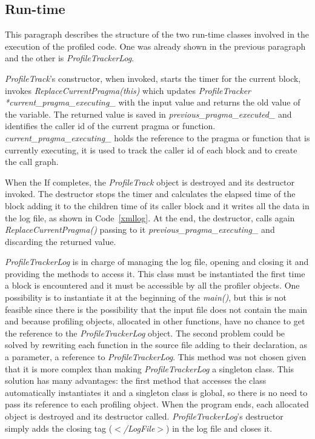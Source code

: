 \documentclass[a4paper,12pt,oneside]{book}
\begin{document}
\subsection{Run-time}
\label{profilerun}

This paragraph describes the structure of the two run-time classes involved in the execution of the profiled code. One was already shown in the previous paragraph and the other is \emph{ProfileTrackerLog}. 

\emph{ProfileTrack}’s constructor, when invoked, starts the timer for the current block, invokes \emph{ReplaceCurrentPragma(this)} which updates \emph{ProfileTracker *current\_pragma\_executing\_} with the input value and returns the old value of the variable. The returned value is saved in \emph{previous\_pragma\_executed\_} and identifies the caller id of the current pragma or function. \emph{current\_pragma\_executing\_} holds the reference to the pragma or function that is currently executing, it is used to track the caller id of each block and to create the call graph. 

When the If completes, the \emph{ProfileTrack} object is destroyed and its destructor invoked. The destructor stops the timer and calculates the elapsed time of the block adding it to the children time of its caller block and it writes all the data in the log file, as shown in Code~\ref{xmllog}. At the end, the destructor, calls again \emph{ReplaceCurrentPragma()} passing to it \emph{previous\_pragma\_executing\_} and discarding the returned value.

\emph{ProfileTrackerLog} is in charge of managing the log file, opening and closing it and providing the methods to access it. This class must be instantiated the first time a block is encountered and it must be accessible by all the profiler objects. One possibility is to instantiate it at the beginning of the \emph{main()}, but this is not feasible since there is the possibility that the input file does not contain the main and because profiling objects, allocated in other functions, have no chance to get the reference to the \emph{ProfileTrackerLog} object. The second problem could be solved by rewriting each function in the source file adding to their declaration, as a parameter, a reference to \emph{ProfileTrackerLog}. This method was not chosen given that it is more complex than making \emph{ProfileTrackerLog} a singleton class. This solution has many advantages: the first method that accesses the class automatically instantiates it and a singleton class is global, so there is no need to pass its reference to each profiling object. When the program ends, each allocated object is destroyed and its destructor called. \emph{ProfileTrackerLog}'s destructor simply adds the closing tag (\emph{$<$/LogFile$>$}) in the log file and closes it.
\end{document}
